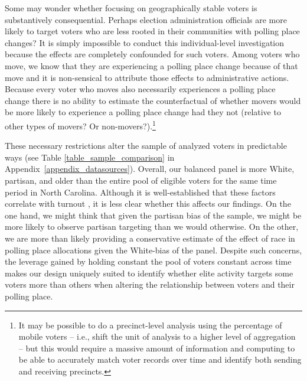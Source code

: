 \documentclass[12pt]{article}
\begin{document}
Some may wonder whether focusing on geographically stable voters is substantively consequential.  Perhaps election administration officials are more likely to target voters who are less rooted in their communities with polling place changes?  It is simply impossible to conduct this individual-level investigation because the effects are completely confounded for such voters.  Among voters who move, we know that they are experiencing a polling place change because of that move and it is non-sensical to attribute those effects to administrative actions. Because every voter who moves also necessarily experiences a polling place change there is no ability to estimate the counterfactual of whether movers would be more likely to experience a polling place change had they not (relative to other types of movers? Or non-movers?).\footnote{It may be possible to do a precinct-level analysis using the percentage of mobile voters -- i.e., shift the unit of analysis to a higher level of aggregation -- but this would require a massive amount of information and computing to be able to accurately match voter records over time and identify both sending and receiving precincts.}

These necessary restrictions alter the sample of analyzed voters in predictable ways (see Table \ref{table_sample_comparison} in Appendix~\ref{appendix_datasources}).  Overall, our balanced panel is more White, partisan, and older than the entire pool of eligible voters for the same time period in North Carolina. Although it is well-established that these factors correlate with turnout \citep{wolfinger1980votes, leighley2013votes}, it is less clear whether this affects our findings. On the one hand, we might think that given the partisan bias of the sample, we might be more likely to observe partisan targeting than we would otherwise. On the other, we are more than likely providing a conservative estimate of the effect of race in polling place allocations given the White-bias of the panel. Despite such concerns, the leverage gained by holding constant the pool of voters constant across time makes our design uniquely suited to identify whether elite activity targets some voters more than others when altering the relationship between voters and their polling place.
\end{document}
